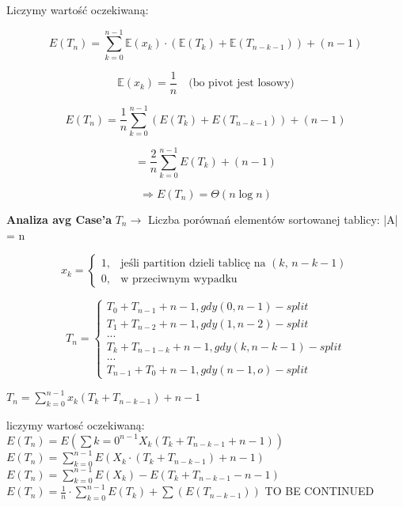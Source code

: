 \documentclass{article}
\begin{document}
\par
Liczymy wartość oczekiwaną:

\[
E(T_n) = \sum_{k=0}^{n-1} \mathbb{E}(x_k) \cdot \left( \mathbb{E}(T_k) + \mathbb{E}(T_{n-k-1}) \right) + (n - 1)
\]

\[
\mathbb{E}(x_k) = \frac{1}{n} \quad \text{(bo pivot jest losowy)}
\]

\[
E(T_n) = \frac{1}{n} \sum_{k=0}^{n-1} \left( E(T_k) + E(T_{n-k-1}) \right) + (n - 1)
\]

\[
= \frac{2}{n} \sum_{k=0}^{n-1} E(T_k) + (n - 1)
\]

\[
\Rightarrow E(T_n) = \Theta(n \log n)
\]


    \textbf{Analiza avg Case'a}
    $T_n \rightarrow$ Liczba porównań elementów sortowanej tablicy: |A| = n \newline

\[
x_k =
\begin{cases}
    1, & \mbox{jeśli partition dzieli tablicę na } (k,\, n - k - 1) \\[0.6em]
    0, & \mbox{w przeciwnym wypadku}
\end{cases}
\]


\[
    T_n =
    \begin{cases}
        T_0 + T_{n-1} + n-1, gdy (0, n-1) -split \\
        T_1 + T_{n-2} + n -1, gdy (1, n-2) -split \\
        ... \\
        T_k + T_{n-1-k} + n - 1, gdy (k, n-k-1) -split \\
        ... \\
        T_{n-1} + T_0 + n - 1, gdy (n-1, o) -split
    \end{cases}
    \]

    $T_n = \sum_{k=0}^{n-1} x_k (T_k + T_{n-k-1}) + n - 1$ \newline

    liczymy wartosć oczekiwaną: \newline
    $E(T_n) = E (\sum{k=0}^{n-1} X_k (T_k + T_{n-k-1} + n - 1))$ \newline
    $E(T_n) = \sum_{k=0}^{n-1} E(X_k \cdot (T_k + T_{n-k-1}) + n - 1) $ \newline
    $E(T_n) = \sum_{k=0}^{n-1} E(X_k) - E(T_k + T_{n-k-1} - n - 1)$ \newline
    $E(T_n) = \frac{1}{n} \cdot \sum_{k=0}^{n-1} E(T_k) + \sum (E(T_{n-k-1}))$ \newline
    TO BE CONTINUED
\end{document}
